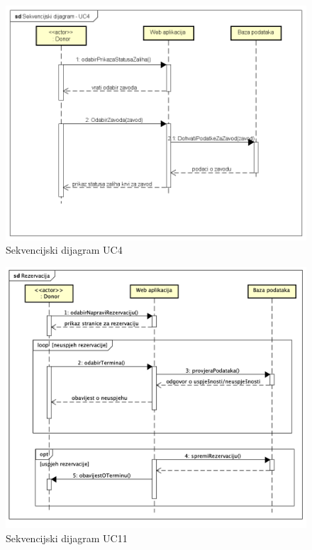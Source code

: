 				\begin{figure}[H]
					\includegraphics[scale=0.4]{slike/Dijagrami/Sekvencijski dijagram - UC4} %
					\centering
					\caption{Sekvencijski dijagram UC4}
					\label{fig:promjene}
				\end{figure}
				\begin{figure}[H]
					\includegraphics[scale=0.4]{slike/Dijagrami/Sekvencijski dijagram - UC11} %
					\centering
					\caption{Sekvencijski dijagram UC11}
					\label{fig:promjene}
				\end{figure}
